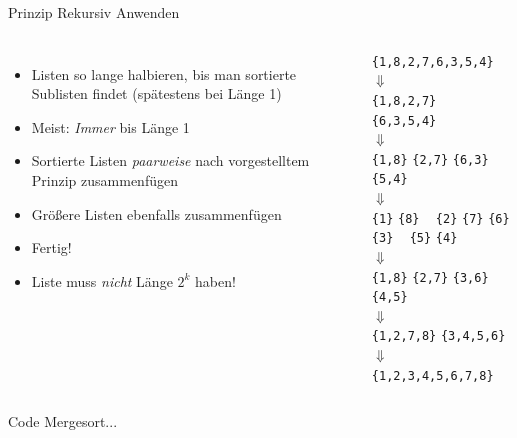 \begin{frame}{Prinzip Rekursiv Anwenden}
%
\vspace{-5pt}
\begin{columns}[T]
\begin{itemize}
\item Listen so lange halbieren, bis man sortierte Sublisten findet (spätestens bei Länge 1)
\item Meist: \emph{Immer} bis Länge 1
\item Sortierte Listen \emph{paarweise} nach vorgestelltem Prinzip zusammenfügen
\item Größere Listen ebenfalls zusammenfügen
\item Fertig!
\item Liste muss \emph{nicht} Länge $2^k$ haben!
\end{itemize}
%
\vspace{-7pt}
\begin{tcolorbox}
\begin{center}
\texttt{\{1,8,2,7,6,3,5,4\}} \\
$\Downarrow$ \\
\texttt{\{1,8,2,7\}} ~ \texttt{\{6,3,5,4\}} \\
$\Downarrow$ \\
\texttt{\{1,8\}} \texttt{\{2,7\}} \quad \texttt{\{6,3\}} \texttt{\{5,4\}} \\
$\Downarrow$ \\
\texttt{\{1\}} \texttt{\{8\}} ~
\texttt{\{2\}} \texttt{\{7\}} \quad
\texttt{\{6\}} \texttt{\{3\}} ~
\texttt{\{5\}} \texttt{\{4\}} \\
$\Downarrow$ \\
\texttt{\{1,8\}} \texttt{\{2,7\}} \quad \texttt{\{3,6\}} \texttt{\{4,5\}} \\
$\Downarrow$ \\
\texttt{\{1,2,7,8\}} \texttt{\{3,4,5,6\}} \\
$\Downarrow$ \\
\texttt{\{1,2,3,4,5,6,7,8\}}
\end{center}
\end{tcolorbox}
\end{columns}
%
\end{frame}


\begin{frame}
%
\begin{center}
Code Mergesort...
\end{center}
%
\end{frame}